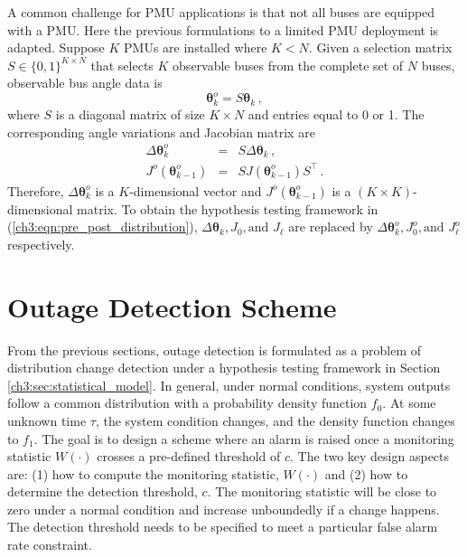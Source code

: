 A common challenge for PMU applications is that not all buses are equipped with a PMU. Here the previous formulations to a limited PMU deployment is adapted. Suppose $K$ PMUs are installed where $K < N$. Given a selection matrix ${S} \in \{ 0 ,1 \}^{K \times N}$ that selects $K$ observable buses from the complete set of $N$ buses, observable bus angle data is 
\begin{equation}
\boldsymbol{\theta}^o_k = {S} \boldsymbol{\theta}_k \,,
\end{equation} where ${S}$ is a diagonal matrix of size $K \times N$ and entries equal to 0 or 1. The corresponding angle variations and Jacobian matrix are 
\begin{eqnarray}
\Delta\boldsymbol{\theta}^o_{k} &=& {S} \Delta\boldsymbol{\theta}_k \,, \\
{J}^o(\boldsymbol{\theta}^o_{k-1}) &=& {S} {J}(\boldsymbol{\theta}^o_{k-1}) {S}^\top \,.
\end{eqnarray}
Therefore, $\Delta\boldsymbol{\theta}^o_{k}$ is a $K$-dimensional vector and ${J}^o(\boldsymbol{\theta}^o_{k-1})$ is a $(K \times K)$-dimensional matrix. To obtain the hypothesis testing framework in (\ref{ch3:eqn:pre_post_distribution}), $\Delta\boldsymbol{\theta}_k, {J}_0, \text{and } {J}_{\ell}$ are replaced by $\Delta\boldsymbol{\theta}^o_k, {J}^o_0, \text{and } {J}^o_{\ell}$ respectively. 


\section{Outage Detection Scheme}
\label{ch3:sec:detection_scheme}
From the previous sections, outage detection is formulated as a problem of distribution change detection under a hypothesis testing framework in Section \ref{ch3:sec:statistical_model}. In general, under normal conditions, system outputs follow a common distribution with a probability density function $f_0$. At some unknown time $\tau$, the system condition changes, and the density function changes to $f_1$. The goal is to design a scheme where an alarm is raised once a monitoring statistic $W(\cdot)$ crosses a pre-defined threshold of $c$. The two key design aspects are: (1) how to compute the monitoring statistic, $W(\cdot)$ and (2) how to determine the detection threshold, $c$. The monitoring statistic will be close to zero under a normal condition and increase unboundedly if a change happens. The detection threshold needs to be specified to meet a particular false alarm rate constraint. 

